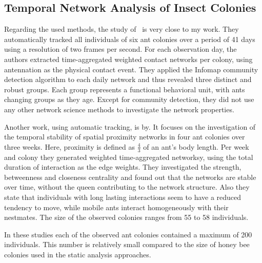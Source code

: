 \subsection{Temporal Network Analysis of Insect Colonies}

Regarding the used methods, the study of~\textcite{mersch2013tracking} is very close to my work.
They automatically tracked all individuals of six ant colonies over a period of 41 days using a resolution of two frames per second.
For each observation day, the authors extracted time-aggregated weighted contact networks per colony, using antennation as the physical contact event.
They applied the Infomap community detection algorithm to each daily network and thus revealed three distinct and robust groups.
Each group represents a functional behavioral unit, with ants changing groups as they age.
Except for community detection, they did not use any other network science methods to investigate the network properties.


Another work, using automatic tracking, is by\textcite{jeanson2012long}.
It focuses on the investigation of the temporal stability of spatial proximity networks in four ant colonies over three weeks.
Here, proximity is defined as $\frac{4}{3}$ of an ant’s body length.
Per week and colony they generated weighted time-aggregated networksy,  using the total duration of interaction as the edge weights.
They investigated the strength, betweenness and closeness centrality and found out that the networks are stable over time, without the queen contributing to the network structure.
Also they state that individuals with long lasting interactions seem to have a reduced tendency to move, while mobile ants interact homogeneously with their nestmates.
The size of the observed colonies ranges from 55 to 58 individuals.


In these studies each of the observed ant colonies contained a maximum of 200 individuals. This number is relatively small compared to the size of honey bee colonies used in the static analysis approaches.